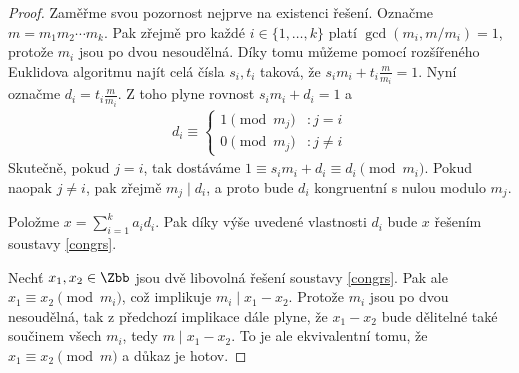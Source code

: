 \begin{proof}
Zaměřme svou pozornost nejprve na existenci řešení. Označme
$ m = m_1 m_2 \cdots m_k $. Pak zřejmě pro každé $ i \in \{1,\dots,k\} $
platí $ \gcd(m_i, m / m_i) = 1 $, protože $ m_i $ jsou po dvou nesoudělná.
Díky tomu můžeme pomocí rozšířeného Euklidova algoritmu najít celá čísla
$ s_i, t_i $ taková, že $ s_i m_i + t_i \frac{m}{m_i} = 1 $. Nyní označme
$ d_i = t_i \frac{m}{m_i} $. Z toho plyne rovnost $ s_i m_i + d_i = 1 $ a
\begin{align*}
d_i \equiv
\left\{
  \begin{array}{lr}
    1 \pmod{ m_j } & : j = i \\
    0 \pmod{ m_j }  & : j \neq i
  \end{array}
\right.
\end{align*}
Skutečně, pokud $ j = i $, tak dostáváme
$ 1 \equiv s_i m_i + d_i \equiv d_i \pmod{m_i} $. Pokud naopak $ j \neq i $, pak
zřejmě $ m_j \mid d_i $, a proto bude $ d_i $ kongruentní s nulou modulo $ m_j $.

Položme $ x = \sum\limits_{i = 1}^{k} a_i d_i $. Pak díky výše uvedené
vlastnosti $ d_i $ bude $ x $ řešením soustavy \eqref{congrs}.

Nechť $ x_1, x_2 \in \Zbb $ jsou dvě libovolná řešení soustavy \eqref{congrs}.
Pak ale $ x_1 \equiv x_2 \pmod{m_i} $, což implikuje $ m_i \mid x_1 - x_2 $.
Protože $ m_i $ jsou po dvou nesoudělná, tak z předchozí implikace dále plyne, že
$ x_1 - x_2 $ bude dělitelné také součinem všech $ m_i $, tedy
$ m \mid x_1 - x_2 $. To je ale ekvivalentní tomu, že
$ x_1 \equiv x_2 \pmod{m} $ a důkaz je hotov.
\end{proof}

